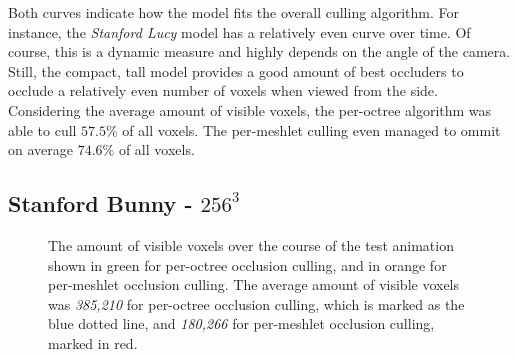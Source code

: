 \noindent 
Both curves indicate how the model fits the overall culling algorithm. For instance, the \emph{Stanford Lucy} 
model has a relatively even curve over time. Of course, this is a dynamic measure and highly depends on the 
angle of the camera. Still, the compact, tall model provides a good amount of best occluders to occlude a 
relatively even number of voxels when viewed from the side. \\

\noindent
Considering the average amount of visible voxels, the per-octree algorithm was able to cull $57.5\%$ of all 
voxels. The per-meshlet culling even managed to ommit on average $74.6\%$ of all voxels. 



\subsection*{Stanford Bunny - $256^3$}



\begin{figure}[h]              %
    \begin{center}
      \caption{The amount of visible voxels over the course of the test animation shown in green for 
      per-octree occlusion culling, and in orange for per-meshlet occlusion culling. 
      The average amount of visible voxels was \emph{385,210} for per-octree occlusion culling, which is 
      marked as the blue dotted line, and \emph{180,266} for per-meshlet occlusion culling, marked in red.}
      \label{plt:bunny-256-culling-res-voxels}
    \end{center}
  \end{figure}

